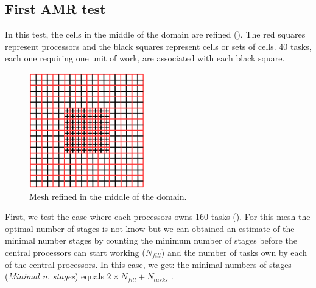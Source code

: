 \documentclass{mc2015}
\renewcommand{\(}{\left(}
\renewcommand{\)}{\right)}
\renewcommand{\[}{\left[}
\renewcommand{\]}{\right]}
\begin{document}
\subsection{First AMR test}

In this test, the cells in the middle of the domain are refined ().
The red squares represent processors and the black squares represent cells
or sets of cells. 40 tasks, each one requiring one unit of work, are
associated with each black square.

\begin{figure}[H]
  \centering
  \includegraphics[width=5cm]{mesh}
  \caption{Mesh refined in the middle of the domain.}
  \label{mesh_1}
\end{figure}

First, we test the case where each processors owns 160 tasks (). For
this mesh the optimal number of stages is not know but we can obtained an
estimate of
the minimal number stages by counting the minimum number of stages before the
central processors can start working ($N_{fill}$) and the number of tasks own by
each of the central processors. In this case, we get: the minimal numbers of stages
(\emph{Minimal n. stages}) equals $2\times N_{fill}+N_{tasks}$ \cite{Adams2013}.
\end{document}
